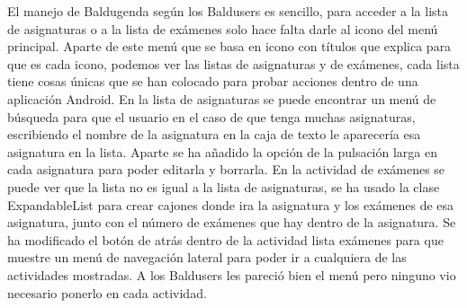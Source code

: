 El manejo de Baldugenda según los Baldusers es sencillo, para acceder a la lista de asignaturas o a la lista de exámenes solo hace falta darle al icono del menú principal.
Aparte de este menú que se basa en icono con títulos que explica para que es cada icono, podemos ver las listas de asignaturas y de exámenes, cada lista tiene cosas únicas que se han colocado para probar acciones dentro de una aplicación Android.
En la lista de asignaturas se puede encontrar un menú de búsqueda para que el usuario en el caso de que tenga muchas asignaturas, escribiendo el nombre de la asignatura en la caja de texto le aparecería esa asignatura en la lista.
Aparte se ha añadido la opción de la pulsación larga en cada asignatura para poder editarla y borrarla.
En la actividad de exámenes se puede ver que la lista no es igual a la lista de asignaturas, se ha usado la clase ExpandableList para crear cajones donde ira la asignatura y los exámenes de esa asignatura, junto con el número de exámenes que hay dentro de la asignatura.
Se ha modificado el botón de atrás dentro de la actividad lista exámenes para que muestre un menú de navegación lateral para poder ir a cualquiera de las actividades mostradas. A los Baldusers les pareció bien el menú pero ninguno vio necesario ponerlo en cada actividad.
